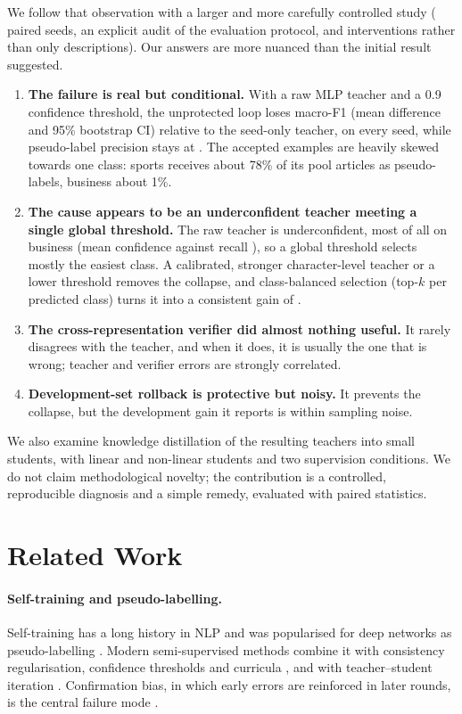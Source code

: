 \documentclass[11pt]{article}
\begin{document}
We follow that observation with a larger and more carefully controlled study (\nSeeds{} paired seeds, an explicit audit of the evaluation protocol, and interventions rather than only descriptions). Our answers are more nuanced than the initial result suggested.
\begin{enumerate}
\item \textbf{The failure is real but conditional.} With a raw MLP teacher and a 0.9 confidence threshold, the unprotected loop loses \cmpMainNaive{} macro-F1 (mean difference and 95\% bootstrap CI) relative to the seed-only teacher, on every seed, while pseudo-label precision stays at \precMainNaive{}. The accepted examples are heavily skewed towards one class: sports receives about 78\% of its pool articles as pseudo-labels, business about 1\%.
\item \textbf{The cause appears to be an underconfident teacher meeting a single global threshold.} The raw teacher is underconfident, most of all on business (mean confidence \meanConfMlpBusiness{} against recall \recallMlpBusiness{}), so a global threshold selects mostly the easiest class. A calibrated, stronger character-level teacher or a lower threshold removes the collapse, and class-balanced selection (top-$k$ per predicted class) turns it into a consistent gain of \cmpMainBalanced{}.
\item \textbf{The cross-representation verifier did almost nothing useful.} It rarely disagrees with the teacher, and when it does, it is usually the one that is wrong; teacher and verifier errors are strongly correlated.
\item \textbf{Development-set rollback is protective but noisy.} It prevents the collapse, but the development gain it reports is within sampling noise.
\end{enumerate}
We also examine knowledge distillation of the resulting teachers into small students, with linear and non-linear students and two supervision conditions. We do not claim methodological novelty; the contribution is a controlled, reproducible diagnosis and a simple remedy, evaluated with paired statistics.

\section{Related Work}
\paragraph{Self-training and pseudo-labelling.} Self-training has a long history in NLP \citep{yarowsky1995unsupervised} and was popularised for deep networks as pseudo-labelling \citep{lee2013pseudo}. Modern semi-supervised methods combine it with consistency regularisation, confidence thresholds and curricula \citep{sohn2020fixmatch,zhang2021flexmatch}, and with teacher--student iteration \citep{xie2020noisy}. Confirmation bias, in which early errors are reinforced in later rounds, is the central failure mode \citep{arazo2020pseudo}.
\end{document}
